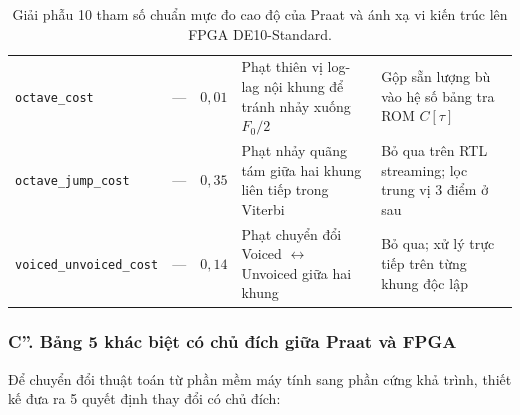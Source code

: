 \documentclass[11pt,a4paper]{article}
\begin{document}
\begin{table}[h]
{\begin{tabular}{@{}llclp{7.5cm}@{}}
\texttt{octave\_cost} & --- & $0{,}01$ & Phạt thiên vị log-lag nội khung để tránh nhảy xuống $F_0/2$ & Gộp sẵn lượng bù vào hệ số bảng tra ROM $C[\tau]$ \\
\texttt{octave\_jump\_cost} & --- & $0{,}35$ & Phạt nhảy quãng tám giữa hai khung liên tiếp trong Viterbi & Bỏ qua trên RTL streaming; lọc trung vị 3 điểm ở sau \\
\texttt{voiced\_unvoiced\_cost}& --- & $0{,}14$ & Phạt chuyển đổi Voiced $\leftrightarrow$ Unvoiced giữa hai khung & Bỏ qua; xử lý trực tiếp trên từng khung độc lập \\ \bottomrule
\end{tabular}%
}
\caption{Giải phẫu 10 tham số chuẩn mực đo cao độ của Praat và ánh xạ vi kiến trúc lên FPGA DE10-Standard.}
\label{tab:praat_params}
\end{table}

\subsubsection*{C''. Bảng 5 khác biệt có chủ đích giữa Praat và FPGA}

Để chuyển đổi thuật toán từ phần mềm máy tính sang phần cứng khả trình, thiết kế đưa ra 5 quyết định thay đổi có chủ đích:
\end{document}

